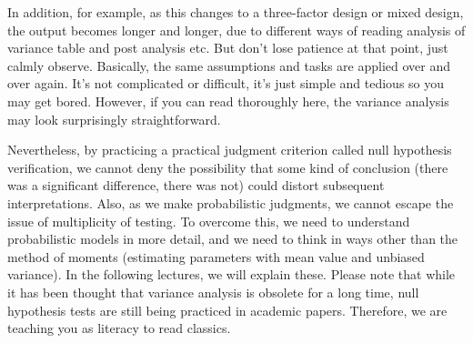 \documentclass{ltjbook}
\begin{document}
In addition, for example, as this changes to a three-factor design or mixed design, the output becomes longer and longer, due to different ways of reading analysis of variance table and post analysis etc. But don't lose patience at that point, just calmly observe. Basically, the same assumptions and tasks are applied over and over again. It's not complicated or difficult, it's just simple and tedious so you may get bored. However, if you can read thoroughly here, the variance analysis may look surprisingly straightforward.

Nevertheless, by practicing a practical judgment criterion called null hypothesis verification, we cannot deny the possibility that some kind of conclusion (there was a significant difference, there was not) could distort subsequent interpretations. Also, as we make probabilistic judgments, we cannot escape the issue of multiplicity of testing. To overcome this, we need to understand probabilistic models in more detail, and we need to think in ways other than the method of moments (estimating parameters with mean value and unbiased variance). In the following lectures, we will explain these. Please note that while it has been thought that variance analysis is obsolete for a long time, null hypothesis tests are still being practiced in academic papers. Therefore, we are teaching you as literacy to read classics.
\end{document}
